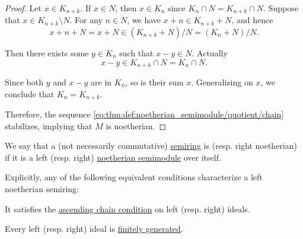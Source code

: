 \begin{proof}
  Let \( x \in K_{n + k} \). If \( x \in N \), then \( x \in K_n \) since \( K_n \cap N = K_{n + k} \cap N \). Suppose that \( x \in K_{n + k} \setminus N \). For any \( n \in N \), we have \( x + n \in K_{n + k} + N \), and hence
  \begin{equation*}
    x + n + N = x + N \in (K_{n + k} + N) / N = (K_n + N) / N.
  \end{equation*}

  Then there exists some \( y \in K_n \) such that \( x - y \in N \). Actually
  \begin{equation*}
    x - y \in K_{n + k} \cap N = K_n \cap N.
  \end{equation*}

  Since both \( y \) and \( x - y \) are in \( K_n \), so is their sum \( x \). Generalizing on \( x \), we conclude that \( K_n = K_{n + k} \).

  Therefore, the sequence \eqref{eq:thm:def:noetherian_semimodule/quotient/chain} stabilizes, implying that \( M \) is noetherian.
\end{proof}

\begin{definition}\label{def:noetherian_semiring}
  We say that a (not necessarily commutative) \hyperref[def:semiring]{semiring} is  (resp. right noetherian) if it is a left (resp. right) \hyperref[def:noetherian_semimodule]{noetherian semimodule} over itself.

  Explicitly, any of the following equivalent conditions characterize a left noetherian semiring:
  \begin{thmenum}
     It satisfies the \hyperref[def:chain_condition]{ascending chain condition} on left (resp. right) ideals.

     Every left (resp. right) ideal is \hyperref[def:semiring_ideal/generated]{finitely generated}.
  \end{thmenum}
\end{definition}

